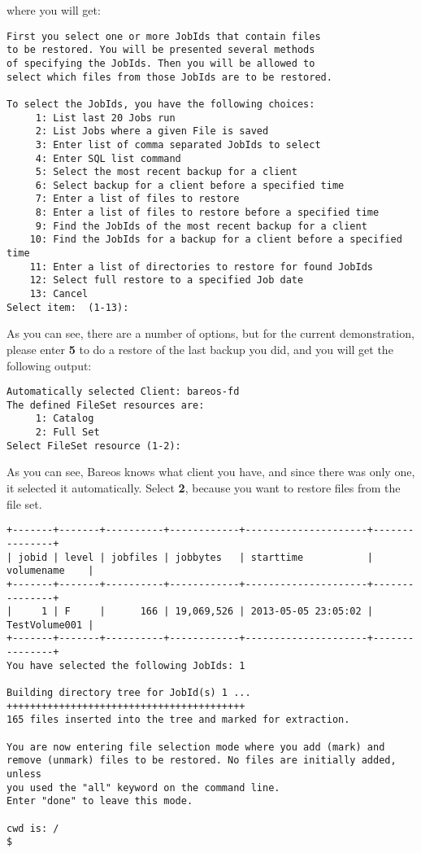 where you will get:

\footnotesize
\begin{verbatim}
First you select one or more JobIds that contain files
to be restored. You will be presented several methods
of specifying the JobIds. Then you will be allowed to
select which files from those JobIds are to be restored.

To select the JobIds, you have the following choices:
     1: List last 20 Jobs run
     2: List Jobs where a given File is saved
     3: Enter list of comma separated JobIds to select
     4: Enter SQL list command
     5: Select the most recent backup for a client
     6: Select backup for a client before a specified time
     7: Enter a list of files to restore
     8: Enter a list of files to restore before a specified time
     9: Find the JobIds of the most recent backup for a client
    10: Find the JobIds for a backup for a client before a specified time
    11: Enter a list of directories to restore for found JobIds
    12: Select full restore to a specified Job date
    13: Cancel
Select item:  (1-13): 
\end{verbatim}
\normalsize

As you can see, there are a number of options, but for the current
demonstration, please enter {\bf 5} to do a restore of the last backup you
did, and you will get the following output:

\footnotesize
\begin{verbatim}
Automatically selected Client: bareos-fd
The defined FileSet resources are:
     1: Catalog
     2: Full Set
Select FileSet resource (1-2): 
\end{verbatim}
\normalsize

As you can see, Bareos knows what client
you have, and since there was only one, it selected it automatically.
Select {\bf 2}, because you want to restore files from the file set.

\footnotesize
\begin{verbatim}
+-------+-------+----------+------------+---------------------+---------------+
| jobid | level | jobfiles | jobbytes   | starttime           | volumename    |
+-------+-------+----------+------------+---------------------+---------------+
|     1 | F     |      166 | 19,069,526 | 2013-05-05 23:05:02 | TestVolume001 |
+-------+-------+----------+------------+---------------------+---------------+
You have selected the following JobIds: 1

Building directory tree for JobId(s) 1 ...  +++++++++++++++++++++++++++++++++++++++++
165 files inserted into the tree and marked for extraction.

You are now entering file selection mode where you add (mark) and
remove (unmark) files to be restored. No files are initially added, unless
you used the "all" keyword on the command line.
Enter "done" to leave this mode.

cwd is: /
$ 
\end{verbatim}
\normalsize

